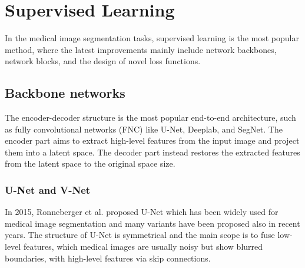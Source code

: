 
\section{Supervised Learning}
In the medical image segmentation tasks, supervised learning is the most popular method, where the latest improvements mainly include network backbones, network blocks, and the design of novel loss functions.

\subsection{Backbone networks}
The encoder-decoder structure is the most popular end-to-end architecture, such as fully convolutional networks (FNC) like U-Net, Deeplab, and SegNet. The encoder part aims to extract high-level features from the input image and project them into a latent space. The decoder part instead restores the extracted features
from the latent space to the original space size.

\subsubsection{U-Net and V-Net}
In 2015, Ronneberger et al.
proposed U-Net which has been widely used for medical image segmentation and
many variants have been proposed also in recent years. The structure of U-Net
is symmetrical and the main scope is to fuse low-level features, which medical
images are usually noisy but show blurred boundaries, with high-level features
via skip connections.

